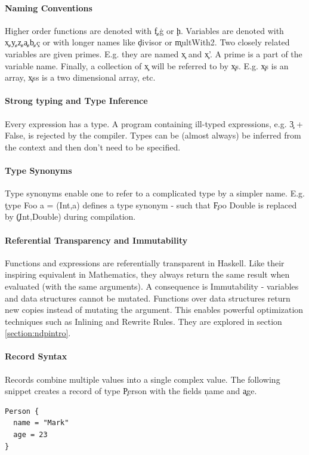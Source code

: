   \paragraph{Naming Conventions}
    Higher order functions are denoted with \c{f},\c{g} or \c{h}.
    Variables are denoted with \c{x},\c{y},\c{z},\c{a},\c{b},\c{c}
    or with longer names like \c{divisor} or \c{multWith2}.
    Two closely related variables are given
    primes. E.g. they are named \c{x} and \c{x'}. A prime is a part of the variable name.
    Finally, a collection of \c{x} will be referred to by \c{xs}.
    E.g. \c{xs} is an array, \c{xss} is a two dimensional array, etc.
  
  \paragraph{Strong typing and Type Inference}
    Every expression has a type. A program containing
    ill-typed expressions, e.g. \c{3 + False}, is rejected
    by the compiler.
    Types can be (almost always) be inferred from the context and
    then don't need to be specified.
    
  \paragraph{Type Synonyms}
    Type synonyms enable one to refer to a complicated type by a simpler name.
    E.g. \c{type Foo a = (Int,a)} defines a type synonym - such that
    \c{Foo Double} is replaced by \c{(Int,Double)} during compilation.
  
  \paragraph{Referential Transparency and Immutability}
    Functions and expressions are referentially transparent in Haskell.
    Like their inspiring equivalent in Mathematics, they always return
    the same result when evaluated (with the same arguments).
    A consequence is Immutability - variables and data structures
    cannot be mutated. Functions over data structures return
    new copies instead of mutating the argument. This enables
    powerful optimization techniques such as Inlining and Rewrite Rules.
    They are explored in section \ref{section:ndpintro}.
    
  \paragraph{Record Syntax}
    Records combine multiple values into a single complex value.
    The following snippet creates a record of type \c{Person} with the
    fields \c{name} and \c{age}.
    \begin{lstlisting}
Person {
  name = "Mark"
  age = 23
}
    \end{lstlisting}
    
